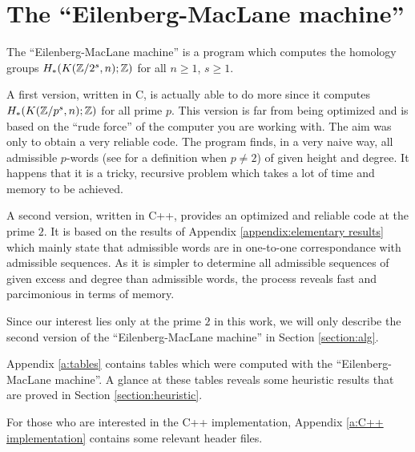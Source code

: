 \chapter{The ``Eilenberg-MacLane machine''}\label{chapter:EMM}

The ``Eilenberg-MacLane machine'' is a program which computes the homology groups $H_*(K(\mathbb{Z}/2^s,n);\mathbb{Z})$ for all $n\geq1$, $s\geq1$. 

A first version, written in C, is actually able to do more since it computes $H_*(K(\mathbb{Z}/p^s,n);\mathbb{Z})$ for all prime $p$. This version is far from being optimized and is based on the ``rude force'' of the computer you are working with. The aim was only to obtain a very reliable code. The program finds, in a very naive way, all admissible $p$-words (see \cite[Expos\'e 9, p. 1]{Ca55} for a definition when $p\not=2$) of given height and degree. It happens that it is a tricky, recursive problem which takes a lot of time and memory to be achieved.

A second version, written in C++, provides an optimized and reliable code at the prime $2$. It is based on the results of Appendix \ref{appendix:elementary results} which mainly state that admissible words are in one-to-one correspondance with admissible sequences. As it is simpler to determine all admissible sequences of given excess and degree than admissible words, the process reveals fast and parcimonious in terms of memory.

Since our interest lies only at the prime $2$ in this work, we will only describe the second version of the ``Eilenberg-MacLane machine'' in Section \ref{section:alg}.

Appendix \ref{a:tables} contains tables which were computed with the ``Eilenberg-MacLane machine''. A glance at these tables reveals some heuristic results that are proved in Section \ref{section:heuristic}.

For those who are interested in the C++ implementation, Appendix \ref{a:C++ implementation} contains some relevant header files.


\newpage
